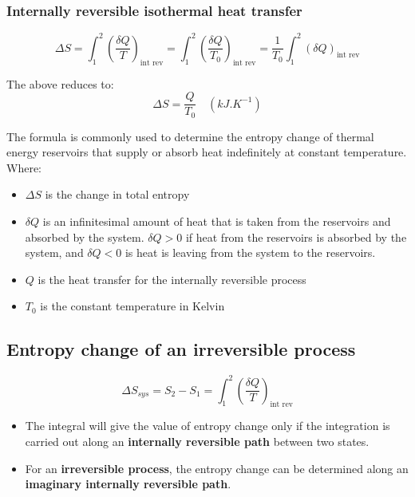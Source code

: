 \documentclass[11pt]{article}
\begin{document}
 \newpage

\subsubsection{Internally reversible isothermal heat transfer}
\label{sec:orgfb8bc05}
\[\Delta S = \int_1^2 \left(\frac{\delta Q}{T} \right)_{\text{int rev}} = \int_1^2 \left(\frac{\delta Q}{T_0} \right)_{\text{int rev}} = \frac{1}{T_0} \int_1^2 (\delta Q)_{\text{int rev}}\]

The above reduces to:
\[\Delta S = \frac{Q}{T_0} \quad (\unit{kJ.K^{-1}})\]

The formula is commonly used to determine the entropy change of thermal energy reservoirs that supply or absorb heat indefinitely at constant temperature.
\\[0pt]

Where:
\begin{itemize}
\item \(\Delta S\) is the change in total entropy
\item \(\delta Q\) is an infinitesimal amount of heat that is taken from the reservoirs and absorbed by the system. \(\delta Q > 0\) if heat from the reservoirs is absorbed by the system, and \(\delta Q < 0\) is heat is leaving from the system to the reservoirs.
\item \(Q\) is the heat transfer for the internally reversible process
\item \(T_0\) is the constant temperature in Kelvin
\end{itemize}

 \newpage

\subsection{Entropy change of an irreversible process}
\label{sec:orgd250de4}
\[\Delta S_{sys} = S_2 - S_1 = \int_1^2 \left(\frac{\delta Q}{T} \right)_{\text{int rev}}\]

\begin{itemize}
\item The integral will give the value of entropy change only if the integration is carried out along an \textbf{internally reversible path} between two states.
\item For an \textbf{irreversible process}, the entropy change can be determined along an \textbf{imaginary internally reversible path}.
\end{itemize}
\end{document}
